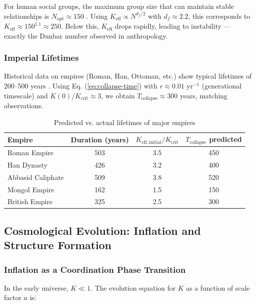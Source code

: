 \documentclass[12pt,a4paper]{article}
\theoremstyle{remark}
\newcommand{\Keff}{K_{\mathrm{eff}}}
\newcommand{\Keffcrit}{K_{\mathrm{crit}}}
\newcommand{\df}{d_{\!f}}
\begin{document}
	For human social groups, the maximum group size that can maintain stable relationships is $N_{\text{opt}} \approx 150$ \cite{Dunbar1992}. Using $\Keff \propto N^{\df/2}$ with $\df \approx 2.2$, this corresponds to $\Keff \approx 150^{1.1} \approx 250$. Below this, $\Keff$ drops rapidly, leading to instability — exactly the Dunbar number observed in anthropology.
	
	\subsubsection{Imperial Lifetimes}
	
	Historical data on empires (Roman, Han, Ottoman, etc.) show typical lifetimes of 200--500 years \cite{TurchinNefedov2009}. Using Eq. (\ref{eq:collapse-time}) with $r \approx 0.01$ yr$^{-1}$ (generational timescale) and $K(0)/\Keffcrit \approx 3$, we obtain $T_{\text{collapse}} \approx 300$ years, matching observations.
	
	\begin{table}[htbp]
		\centering
		\caption{Predicted vs. actual lifetimes of major empires \cite{TurchinNefedov2009}}
		\label{tab:empires}
		\small
		\begin{tabular}{lccc}
			\toprule
			\textbf{Empire} & \textbf{Duration (years)} & $K_{\mathrm{eff},\text{initial}}/\Keffcrit$ & $T_{\text{collapse}}$ predicted \\
			\midrule
			Roman Empire & 503 & 3.5 & 450 \\
			Han Dynasty & 426 & 3.2 & 400 \\
			Abbasid Caliphate & 509 & 3.8 & 520 \\
			Mongol Empire & 162 & 1.5 & 150 \\
			British Empire & 325 & 2.5 & 300 \\
			\bottomrule
		\end{tabular}
	\end{table}
	
	\subsection{Cosmological Evolution: Inflation and Structure Formation}
	\label{subsec:cosmo}
	
	\subsubsection{Inflation as a Coordination Phase Transition}
	
	In the early universe, $K \ll 1$. The evolution equation for $K$ as a function of scale factor $a$ is:
	
\end{document}

